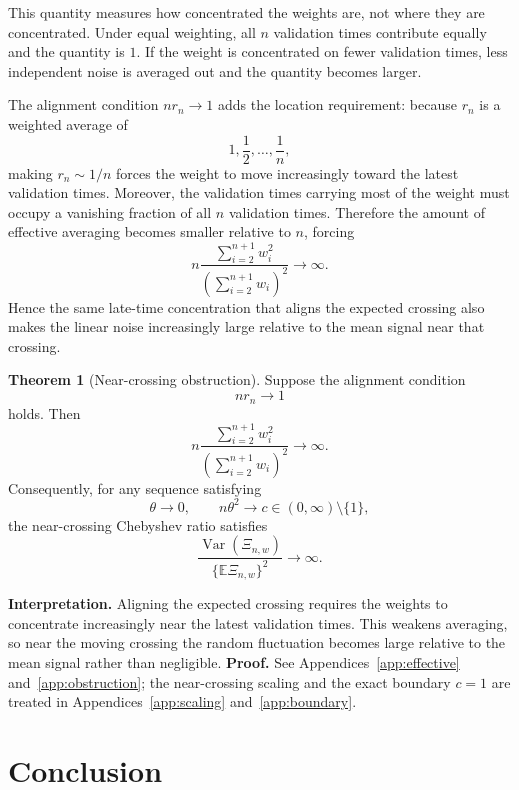 \documentclass[11pt]{article}
\theoremstyle{definition}
\newtheorem{theorem}{Theorem}[section]
\begin{document}
This quantity measures how concentrated the weights are, not where
they are concentrated. Under equal weighting, all $n$ validation times
contribute equally and the quantity is $1$. If the weight is concentrated
on fewer validation times, less independent noise is averaged out and
the quantity becomes larger.

The alignment condition $nr_n\to1$ adds the location requirement:
because $r_n$ is a weighted average of
\[
1,\frac12,\ldots,\frac1n,
\]
making $r_n\sim1/n$ forces the weight to move increasingly toward the
latest validation times. Moreover, the validation times carrying most
of the weight must occupy a vanishing fraction of all $n$ validation
times. Therefore the amount of effective averaging becomes smaller
relative to $n$, forcing
\[
n\frac{\sum_{i=2}^{n+1}w_i^2}
{\left(\sum_{i=2}^{n+1}w_i\right)^2}\to\infty.
\]
Hence the same late-time concentration that aligns the expected crossing
also makes the linear noise increasingly large relative to the mean
signal near that crossing.

\begin{theorem}[Near-crossing obstruction]\label{thm:tradeoff}
Suppose the alignment condition
\[
nr_n\to1
\]
holds. Then
\[
n\frac{\sum_{i=2}^{n+1}w_i^2}
{(\sum_{i=2}^{n+1}w_i)^2}\longrightarrow\infty.
\]
Consequently, for any sequence satisfying
\[
\theta\to0,\qquad n\theta^2\to c\in(0,\infty)\setminus\{1\},
\]
the near-crossing Chebyshev ratio satisfies
\begin{equation}\label{eq:obstruction}
\frac{\operatorname{Var}(\Xi_{n,w})}
{\{\mathbb E\Xi_{n,w}\}^2}\longrightarrow\infty.
\end{equation}
\end{theorem}
\begingroup
\setlength{\emergencystretch}{1em}
\noindent\textbf{Interpretation.} Aligning the expected crossing requires
the weights to concentrate increasingly near the latest validation times.
This weakens averaging, so near the moving crossing the random fluctuation
becomes large relative to the mean signal rather than negligible.
\textbf{Proof.} See
Appendices~\ref{app:effective} and~\ref{app:obstruction};
the near-crossing scaling and the exact boundary $c=1$ are treated in
Appendices~\ref{app:scaling} and~\ref{app:boundary}.
\par\endgroup

\section{Conclusion}
\end{document}
